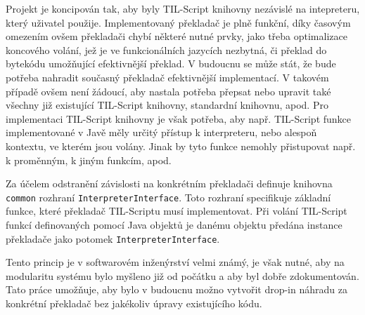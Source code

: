 Projekt je koncipován tak, aby byly TIL-Script knihovny nezávislé na intepreteru, který uživatel
použije. Implementovaný překladač je plně funkční, díky časovým omezením ovšem překladači chybí
některé nutné prvky, jako třeba optimalizace koncového volání, jež je ve funkcionálních
jazycích nezbytná, či překlad do bytekódu umožňující efektivnější překlad. V budoucnu se může stát,
že bude potřeba nahradit současný překladač efektivnější implementací. V takovém případě ovšem není
žádoucí, aby nastala potřeba přepsat nebo upravit také všechny již existující TIL-Script knihovny,
standardní knihovnu, apod. Pro implementaci TIL-Script knihovny je však potřeba, aby např.
TIL-Script funkce implementované v Javě měly určitý přístup k interpreteru, nebo alespoň kontextu,
ve kterém jsou volány. Jinak by tyto funkce nemohly přistupovat např. k proměnným, k jiným funkcím,
apod.

Za účelem odstranění závislosti na konkrétním překladači definuje knihovna \lstinline{common}
rozhraní \lstinline{InterpreterInterface}. Toto rozhraní specifikuje základní funkce, které
překladač TIL-Scriptu musí implementovat. Při volání TIL-Script funkcí definovaných pomocí Java
objektů je danému objektu předána instance překladače jako potomek \lstinline{InterpreterInterface}.

Tento princip je v softwarovém inženýrství velmi známý, je však nutné, aby na modularitu systému
bylo myšleno již od počátku a aby byl dobře zdokumentován. Tato práce umožňuje, aby bylo v budoucnu
možno vytvořit drop-in náhradu za konkrétní překladač bez jakékoliv úpravy existujícího kódu.

\endinput
